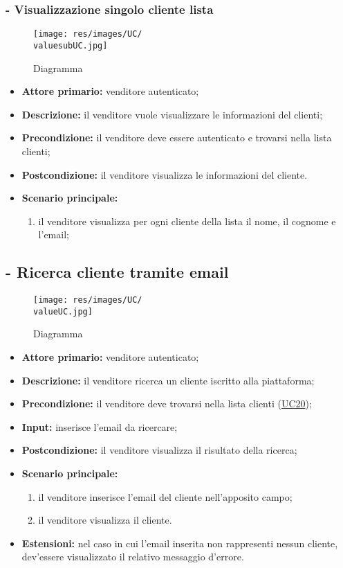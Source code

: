 \stepsubUserCase
\subsubsection{ - Visualizzazione singolo cliente lista}
\begin{figure}[H]
    \centering
    \texttt{[image: res/images/UC/\\valuesubUC.jpg]}
    \caption{Diagramma }
\end{figure}
\begin{itemize}
    \item \textbf{Attore primario:} venditore autenticato;
    \item \textbf{Descrizione:} il venditore vuole visualizzare le informazioni del clienti;
    \item \textbf{Precondizione:} il venditore deve essere autenticato e trovarsi nella lista clienti;
    \item \textbf{Postcondizione:} il venditore visualizza le informazioni del cliente.
    \item \textbf{Scenario principale:}
        \begin{enumerate}
            \item il venditore visualizza per ogni cliente della lista il nome, il cognome e l'email;
        \end{enumerate}
\end{itemize}

\stepUserCase
\subsection{- Ricerca cliente tramite email}
\begin{figure}[H]
    \centering
    \texttt{[image: res/images/UC/\\valueUC.jpg]}
    \caption{Diagramma }
\end{figure}
\begin{itemize}
    \item \textbf{Attore primario:} venditore autenticato;
    \item \textbf{Descrizione:} il venditore ricerca un cliente iscritto alla piattaforma;
    \item \textbf{Precondizione:} il venditore deve trovarsi nella lista clienti (\hyperref[UC20]{UC20});
    \item \textbf{Input:} inserisce l'email da ricercare;
    \item \textbf{Postcondizione:} il venditore visualizza il risultato della ricerca;
    \item \textbf{Scenario principale:}
          \begin{enumerate}
              \item il venditore inserisce l'email del cliente nell'apposito campo;
              \item il venditore visualizza il cliente.
          \end{enumerate}
    \item \textbf{Estensioni:} nel caso in cui l'email inserita non rappresenti nessun cliente, dev'essere visualizzato il relativo messaggio d'errore.
\end{itemize}

